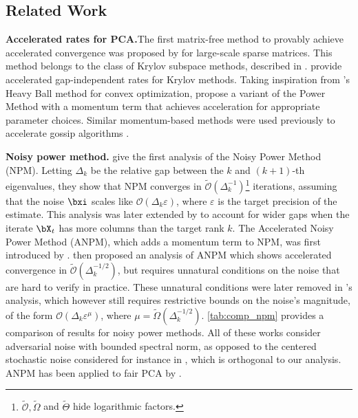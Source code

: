 \documentclass{article}
\theoremstyle{plain}
\theoremstyle{definition}
\theoremstyle{remark}
\begin{document}
\subsection{Related Work}

\textbf{Accelerated rates for PCA.}\quad The first matrix-free method to provably achieve accelerated convergence was proposed by \citet{lanczos50} for large-scale sparse matrices. This method belongs to the class of Krylov subspace methods, described in \cite{saad11}. \citet{musco15} provide accelerated gap-independent rates for Krylov methods. Taking inspiration from \citet{polyak64}'s Heavy Ball method for convex optimization, \citet{xu2018stochastic} propose a variant of the Power Method with a momentum term that achieves acceleration for appropriate parameter choices. Similar momentum-based methods were used previously to accelerate gossip algorithms \cite{liu11}. 

\textbf{Noisy power method.}\quad \citet{hardt14} give the first analysis of the Noisy Power Method (NPM). Letting $\Delta_k$ be the relative gap between the $k$ and $(k+1)$-th eigenvalues, they show that NPM converges in $\tilde{\mathcal{O}}(\Delta_k^{-1})$\footnote{$\tilde{\mathcal{O}},\tilde{\Omega}$ and $\tilde{\Theta}$ hide logarithmic factors.} iterations, assuming that the noise $\bxi$ scales like $\mathcal{O}(\Delta_k\varepsilon)$, where $\varepsilon$ is the target precision of the estimate. This analysis was later extended by \citet{balcan2016} to account for wider gaps when the iterate $\bX_t$ has more columns than the target rank $k$. The Accelerated Noisy Power Method (ANPM), which adds a momentum term to NPM, was first introduced by \citet{mai19}. \citet{xu22} then proposed an analysis of ANPM which shows accelerated convergence in $\tilde{\mathcal{O}}(\Delta_k^{-1/2})$, but requires unnatural conditions on the noise that are hard to verify in practice. These unnatural conditions were later removed in \citet{xu2023anpm}'s analysis, which however still requires restrictive bounds on the noise's magnitude, of the form $\mathcal{O}(\Delta_k\varepsilon^\mu)$, where $\mu=\tilde{\Omega}(\Delta_k^{-1/2})$. \cref{tab:comp_npm} provides a comparison of results for noisy power methods. All of these works consider adversarial noise with bounded spectral norm, as opposed to the centered stochastic noise considered for instance in \citet{shamir16,xu2018stochastic}, which is orthogonal to our analysis. ANPM has been applied to fair PCA by \citet{zhou26}.
\end{document}
